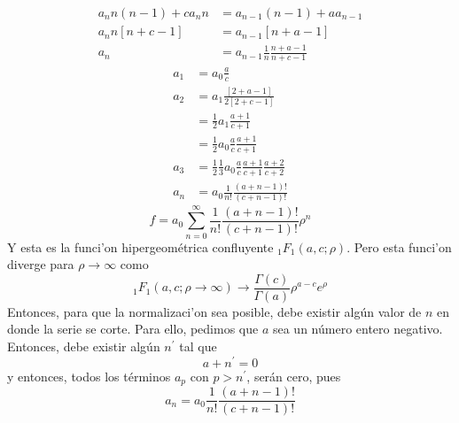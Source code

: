 \begin{align*}
a_{n}n\left(  n-1\right)  +ca_{n}n  & =a_{n-1}\left(  n-1\right)  +aa_{n-1}\\
a_{n}n\left[  n+c-1\right]   & =a_{n-1}\left[  n+a-1\right] \\
a_{n}  & =a_{n-1}\frac{1}{n}\frac{n+a-1}{n+c-1}%
\end{align*}
\begin{align*}
a_{1}  & =a_{0}\frac{a}{c}\\
a_{2}  & =a_{1}\frac{\left[  2+a-1\right]  }{2\left[  2+c-1\right]  }\\
& =\frac{1}{2}a_{1}\frac{a+1}{c+1}\\
& =\frac{1}{2}a_{0}\frac{a}{c}\frac{a+1}{c+1}\\
a_{3}  & =\frac{1}{2}\frac{1}{3}a_{0}\frac{a}{c}\frac{a+1}{c+1}\frac{a+2}%
{c+2}\\
a_{n}  & =a_{0}\frac{1}{n!}\frac{\left(  a+n-1\right)  !}{\left(
c+n-1\right)  !}%
\end{align*}
\begin{equation}
f=a_{0}\sum_{n=0}^{\infty}\frac{1}{n!}\frac{\left(  a+n-1\right)  !}{\left(
c+n-1\right)  !}\rho^{n}%
\end{equation}
Y esta es la funci'on hipergeom\'{e}trica confluyente $_{1}F_{1}\left(
a,c;\rho\right)  $. Pero esta funci'on diverge para $\rho\rightarrow\infty$
como
\begin{equation}
_{1}F_{1}\left(  a,c;\rho\rightarrow\infty\right)  \rightarrow\frac
{\Gamma\left(  c\right)  }{\Gamma\left(  a\right)  }\rho^{a-c}e^{\rho}%
\end{equation}
Entonces, para que la normalizaci'on sea posible, debe existir alg\'{u}n
valor de $n$ en donde la serie se corte. Para ello, pedimos que $a$ sea un
n\'{u}mero entero negativo. Entonces, debe existir alg\'{u}n $n^{\prime}$ tal
que
\begin{equation}
a+n^{\prime}=0
\end{equation}
y entonces, todos los t\'{e}rminos $a_{p}$ con $p>n^{\prime}$, ser\'{a}n cero,
pues
\begin{equation}
a_{n}=a_{0}\frac{1}{n!}\frac{\left(  a+n-1\right)  !}{\left(  c+n-1\right)  !}%
\end{equation}


